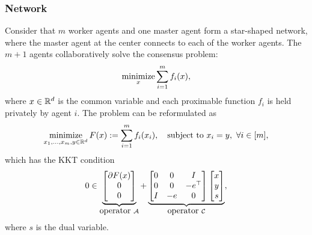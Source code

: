 \subsubsection{Network}\label{sec:network}
Consider that $m$ worker agents and one master agent form a star-shaped network, where the master agent at the center connects to each of the worker agents. The $m+1$ agents collaboratively solve the consensus problem:  $$\operatorname*{minimize}_{x} \sum_{i=1}^m f_i(x),$$ where $x\in \mathbb{R}^d$ is the common variable and each proximable function $f_i$ is held privately by agent $i$. The problem can be reformulated as
\begin{align}
\Min_{x_1,\dots,x_m,y\in \RR^d} F(x) := \sum_{i=1}^mf_i(x_i),\quad \St~ x_i=y, ~\forall i \in [m],
\end{align}
{which has the  KKT condition}
\begin{equation}\label{pro:decentral}
0\in\underbrace{
\begin{bmatrix}
\partial F(x)\\
0 \\
0
\end{bmatrix}}_{\mbox{operator}~\cA}+\underbrace{\begin{bmatrix}
0 & 0&I\\
0 & 0 & -e^\top \\
I & -e & 0
\end{bmatrix}\begin{bmatrix}
x\\
y\\
s
\end{bmatrix}}_{\mbox{operator}~\cC},
\end{equation}
where $s$ is the dual variable.


